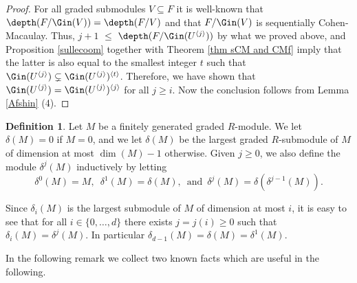 \documentclass[12pt]{amsart}
\theoremstyle{definition}
\theoremstyle{definition}
\newtheorem{definition}[theorem]{Definition}
\renewcommand{\leq}{\leqslant}
\renewcommand{\geq}{\geqslant}
\begin{document}
\begin{proof}
\noindent For all graded submodules $V\subseteq F$ it is well-known that $\depth(F/\Gin(V))=\depth(F/V)$ and that $F/\Gin(V)$ is sequentially Cohen-Macaulay. Thus, $j+1$ $\leq$ $\depth(F/\Gin(U^{\langle j \rangle}))$ by what we proved above, and  Proposition \ref{sullecoom} together with Theorem \ref{thm sCM and CMf} imply that the latter is also  equal to the smallest integer $t$ such that $\Gin(U^{\langle j \rangle}) \subsetneq \Gin(U^{\langle j \rangle})^{\langle t \rangle}$.
Therefore, we have shown  that $\Gin(U^{\langle j \rangle})=\Gin(U^{\langle j \rangle})^{\langle j \rangle}$ for all $j \geq i$. Now the conclusion follows from Lemma \ref{Afshin} (4).
\end{proof}

    
\begin{definition}
  Let $M$ be a finitely generated graded $R$-module. We let $\delta(M)=0$ if $M=0$, and we let $\delta(M)$  be the largest graded $R$-submodule of $M$ of dimension at most $\dim(M)-1$ otherwise.   Given $j \geq 0$, we also define the module $\delta^j(M)$ inductively by letting \[\delta^0(M)=M,\,\,\, \delta^1(M) = \delta(M),\,\,\,\text{and}\,\,\, \delta^j(M) = \delta(\delta^{j-1}(M)).\] 
\end{definition}
\noindent Since  $\delta_i(M)$ is the largest submodule of $M$ of dimension at most $i$, it is easy to see that for all $i\in\{0,\ldots,d\}$  there exists $j=j(i) \geq 0$ such that $\delta_i(M) = \delta^j(M)$. In particular $\delta_{d-1}(M)=\delta(M)=\delta^1(M)$.



In the following remark we collect two known facts which are useful in the following.
\end{document}

